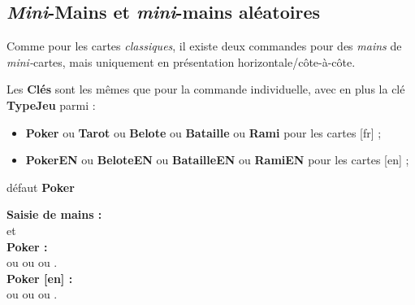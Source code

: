 \documentclass[a4paper]{article}
\newcommand\cmaj[1]{\tcbox[vignetteMaJ]{#1}\xspace}
\newcommand\Cle[1]{{\bfseries\sffamily\textlangle #1\textrangle}}
\begin{document}
{{{{{{{{{{{\subsection{\textit{Mini}-Mains et \textit{mini}-mains aléatoires}

\begin{codeidee}
Comme pour les cartes \textit{classiques}, il existe deux commandes pour des \textit{mains} de \textit{mini-}cartes, mais uniquement en présentation horizontale/côte-à-côte.
\end{codeidee}

\begin{codetex}

\end{codetex}

\begin{codecles}
Les \Cle{Clés} sont les mêmes que pour la commande individuelle, avec en plus la clé \Cle{TypeJeu} parmi :
\begin{itemize}
	\item \Cle{Poker} ou \Cle{Tarot} ou \Cle{Belote} ou \Cle{Bataille} ou \Cle{Rami} pour les cartes [fr] ;
	\item \cmaj{0.2.5} \Cle{PokerEN} ou \Cle{BeloteEN} ou \Cle{BatailleEN} ou \Cle{RamiEN} pour les cartes [en] ;
\end{itemize}
\hfill{}défaut \Cle{Poker}
\end{codecles}

\begin{codetex}[]
\textbf{\large Saisie de mains : }\\
 et~
\\

\textbf{\large Poker : }\\
 ou  ou  ou .\\

\textbf{\large Poker [en] : }\\
 ou  ou  ou .\\


\end{codetex}}}}}}}}}}}}
\end{document}
